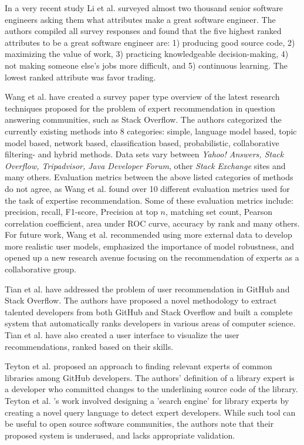         In a very recent study Li et al. \cite{li2019distinguishes} surveyed almost two thousand senior software engineers asking them what attributes make a great software engineer. The authors compiled all survey responses and found that the five highest ranked attributes to be a great software engineer are: 1) producing good source code, 2) maximizing the value of work, 3) practicing knowledgeable decision-making, 4) not making someone else's jobs more difficult, and 5) continuous learning. The lowest ranked attribute was favor trading.
       
        Wang et al. \cite{wang2018survey} have created a survey paper type overview of the latest research techniques proposed for the problem of expert recommendation in question answering communities, such as Stack Overflow. The authors categorized the currently existing methods into 8 categories: simple, language model based, topic model based, network based, classification based, probabilistic, collaborative filtering- and hybrid methods. Data sets vary between \emph{Yahoo! Answers, Stack Overflow, Tripadvisor, Java Developer Forum}, other \emph{Stack Exchange} sites and many others. Evaluation metrics between the above listed categories of methods do not agree, as Wang et al. found over 10 different evaluation metrics used for the task of expertise recommendation. Some of these evaluation metrics include: precision, recall, F1-score, Precision at top $n$, matching set count, Pearson correlation coefficient, area under ROC curve, accuracy by rank and many others. For future work, Wang et al. recommended using more external data to develop more realistic user models, emphasized the importance of model robustness, and opened up a new research avenue focusing on the recommendation of experts as a collaborative group.
        
        Tian et al. \cite{tian2019geek} have addressed the problem of user recommendation in GitHub and Stack Overflow. The authors have proposed a novel methodology to extract talented developers from both GitHub and Stack Overflow and built a complete system that automatically ranks developers in various areas of computer science. Tian et al. have also created a user interface to visualize the user recommendations, ranked based on their skills.
        
        Teyton et al. \cite{teyton2013find} proposed an approach to finding relevant experts of common libraries among GitHub developers. The authors' definition of a library expert is a developer who committed changes to the underlining source code of the library. Teyton et al. \cite{teyton2013find}'s work involved designing a 'search engine' for library experts by creating a novel query language to detect expert developers. While such tool can be useful to open source software communities, the authors note that their proposed system is underused, and lacks appropriate validation. 
        
